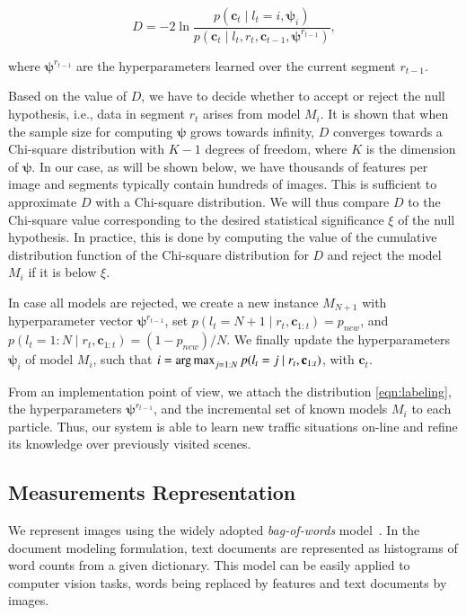 \begin{equation}
\label{eqn:statistic}
D = -2\ln\frac{p(\mathbf{c}_t\mid l_t=i,\boldsymbol{\psi}_i)}{p(\mathbf{c}_t\mid
l_t,r_t,\mathbf{c}_{t-1},\boldsymbol{\psi}^{r_{t-1}})},
\end{equation}

where $\boldsymbol{\psi}^{r_{t-1}}$ are the hyperparameters learned over the
current segment $r_{t-1}$.

Based on the value of $D$, we have to decide whether to accept or reject the
null hypothesis, i.e., data in segment $r_t$ arises from model $M_i$. It is
shown that when the sample size for computing $\boldsymbol{\psi}$ grows towards
infinity, $D$ converges towards a Chi-square distribution with $K-1$ degrees of
freedom, where $K$ is the dimension of $\boldsymbol{\psi}$. In our case, as will
be shown below, we have thousands of features per image and segments typically
contain hundreds of images. This is sufficient to approximate $D$ with a
Chi-square distribution. We will thus compare $D$ to the Chi-square value
corresponding to the desired statistical significance $\xi$ of the null
hypothesis. In practice, this is done by computing the value of the cumulative
distribution function of the Chi-square distribution for $D$ and reject the
model $M_i$ if it is below $\xi$.

In case all models are rejected, we create a new instance $M_{N+1}$
with hyperparameter vector $\boldsymbol{\psi}^{r_{t-1}}$, set $p(l_t=N+1\mid
r_t,\mathbf{c}_{1:t})=p_{new}$, and $p(l_t=1:N\mid r_t,\mathbf{c}_{1:t})=
(1-p_{new})/N$. We finally update the hyperparameters $\boldsymbol{\psi}_i$ of
model $M_i$, such that $i=\operatorname*{arg\,max}_{j=1:N}p(l_t=j\mid
r_t,\mathbf{c}_{1:t})$, with $\mathbf{c}_t$.

From an implementation point of view, we attach the distribution
\eqref{eqn:labeling}, the hyperparameters $\boldsymbol{\psi}^{r_{t-1}}$, and the
incremental set of known models $M_i$ to each particle. Thus, our system is able
to learn new traffic situations on-line and refine its knowledge over
previously visited scenes.

\subsection{Measurements Representation}
We represent images using the widely adopted \emph{bag-of-words}
model~\cite{sivic03video}. In the document modeling formulation, text documents
are represented as histograms of word counts from a given dictionary. This model
can be easily applied to computer vision tasks, words being replaced by features
and text documents by images.

